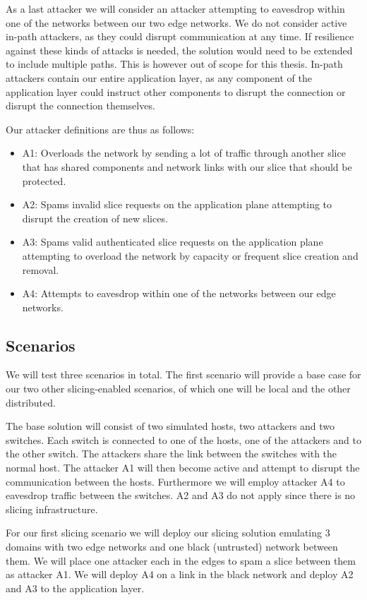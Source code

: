 \documentclass{article}
\begin{document}
As a last attacker we will consider an attacker attempting to eavesdrop within one of the networks between our two edge networks. We do not consider active in-path attackers, as they could disrupt communication at any time. If resilience against these kinds of attacks is needed, the solution would need to be extended to include multiple paths. This is however out of scope for this thesis. In-path attackers contain our entire application layer, as any component of the application layer could instruct other components to disrupt the connection or disrupt the connection themselves.

Our attacker definitions are thus as follows:
\begin{itemize}
    \item A1: Overloads the network by sending a lot of traffic through another slice that has shared components and network links with our slice that should be protected.
    \item A2: Spams invalid slice requests on the application plane attempting to disrupt the creation of new slices.
    \item A3: Spams valid authenticated slice requests on the application plane attempting to overload the network by capacity or frequent slice creation and removal.
    \item A4: Attempts to eavesdrop within one of the networks between our edge networks.
\end{itemize}

\subsection{Scenarios}
We will test three scenarios in total. The first scenario will provide a base case for our two other slicing-enabled scenarios, of which one will be local and the other distributed.

The base solution will consist of two simulated hosts, two attackers and two switches. Each switch is connected to one of the hosts, one of the attackers and to the other switch. The attackers share the link between the switches with the normal host. The attacker A1 will then become active and attempt to disrupt the communication between the hosts. Furthermore we will employ attacker A4 to eavesdrop traffic between the switches. A2 and A3 do not apply since there is no slicing infrastructure.

For our first slicing scenario we will deploy our slicing solution emulating 3 domains with two edge networks and one black (untrusted) network between them. We will place one attacker each in the edges to spam a slice between them as attacker A1. We will deploy A4 on a link in the black network and deploy A2 and A3 to the application layer.
\end{document}
